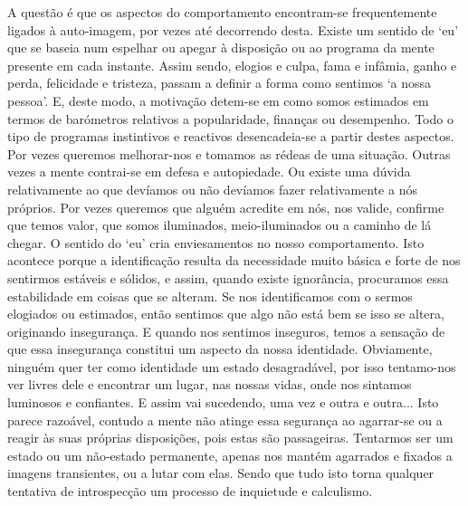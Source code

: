 A questão é que os aspectos do comportamento encontram-se frequentemente ligados à auto-imagem, por vezes até decorrendo desta. Existe um sentido de `eu' que se baseia num espelhar ou apegar à disposição ou ao programa da mente presente em cada instante. Assim sendo, elogios e culpa, fama e infâmia, ganho e perda, felicidade e tristeza, passam a definir a forma como sentimos `a nossa pessoa'. E, deste modo, a motivação detem-se em como somos estimados em termos de barómetros relativos a popularidade, finanças ou desempenho. Todo o tipo de programas instintivos e reactivos desencadeia-se a partir destes aspectos. Por vezes queremos melhorar-nos e tomamos as rédeas de uma situação. Outras vezes a mente contrai-se em defesa e autopiedade. Ou existe uma dúvida relativamente ao que devíamos ou não devíamos fazer relativamente a nós próprios. Por vezes queremos que alguém acredite em nós, nos valide, confirme que temos valor, que somos iluminados, meio-iluminados ou a caminho de lá chegar. O sentido do `eu' cria enviesamentos no nosso comportamento. Isto acontece porque a identificação resulta da necessidade muito básica e forte de nos sentirmos estáveis e sólidos, e assim, quando existe ignorância, procuramos essa estabilidade em coisas que se alteram. Se nos identificamos com o sermos elogiados ou estimados, então sentimos que algo não está bem se isso se altera, originando insegurança. E quando nos sentimos inseguros, temos a sensação de que essa insegurança constitui um aspecto da nossa identidade. Obviamente, ninguém quer ter como identidade um estado desagradável, por isso tentamo-nos ver livres dele e encontrar um lugar, nas nossas vidas, onde nos sintamos luminosos e confiantes. E assim vai sucedendo, uma vez e outra e outra... Isto parece razoável, contudo a mente não atinge essa segurança ao agarrar-se ou a reagir às suas próprias disposições, pois estas são passageiras. Tentarmos ser um estado ou um não-estado permanente, apenas nos mantém agarrados e fixados a imagens transientes, ou a lutar com elas. Sendo que tudo isto torna qualquer tentativa de introspecção um processo de inquietude e calculismo.

